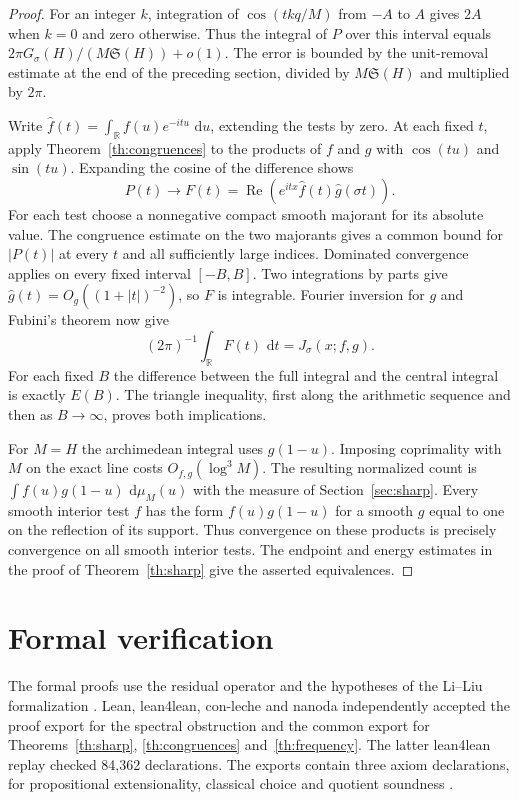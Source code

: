 \documentclass[11pt,a4paper]{article}
\newcommand{\SSg}{\mathfrak S}
\newcommand{\dd}{\,\mathrm d}
\DeclareMathOperator{\Rea}{Re}
\begin{document}
\begin{proof}
For an integer $k$, integration of $\cos(tkq/M)$ from $-A$ to $A$
gives $2A$ when $k=0$ and zero otherwise. Thus the integral of $P$
over this interval equals $2\pi G_\sigma(H)/(M\SSg(H))+o(1)$.
The error is bounded by the unit-removal estimate at the end of the
preceding section, divided by $M\SSg(H)$ and multiplied by $2\pi$.

Write $\widehat f(t)=\int_\mathbb R f(u)e^{-itu}\,\dd u$, extending
the tests by zero. At each fixed $t$, apply
Theorem~\ref{th:congruences} to the products of $f$ and $g$ with
$\cos(tu)$ and $\sin(tu)$. Expanding the cosine of the difference
shows
\[
 P(t)\longrightarrow
 F(t)=\Rea\!\left(e^{itx}\widehat f(t)\widehat g(\sigma t)\right).
\]
For each test choose a nonnegative compact smooth majorant for its
absolute value. The congruence estimate on the two majorants gives
a common bound for $|P(t)|$ at every $t$ and all sufficiently large
indices. Dominated convergence applies on every fixed interval
$[-B,B]$. Two integrations by parts give
$\widehat g(t)=O_g((1+|t|)^{-2})$, so $F$ is integrable.
Fourier inversion for $g$ and Fubini's theorem now give
\[
 (2\pi)^{-1}\int_\mathbb R F(t)\,\dd t=J_\sigma(x;f,g).
\]
For each fixed $B$ the difference between the full integral and the
central integral is exactly $E(B)$. The triangle inequality, first
along the arithmetic sequence and then as $B\to\infty$, proves both
implications.

For $M=H$ the archimedean integral uses $g(1-u)$. Imposing
coprimality with $M$ on the exact line costs $O_{f,g}(\log^3 M)$.
The resulting normalized count is
$\int f(u)g(1-u)\,\dd\mu_M(u)$ with the measure of
Section~\ref{sec:sharp}. Every smooth interior test $f$ has the form
$f(u)g(1-u)$ for a smooth $g$ equal to one on the reflection of its
support. Thus convergence on these products is precisely convergence
on all smooth interior tests. The endpoint and energy estimates in
the proof of Theorem~\ref{th:sharp} give the asserted equivalences.
\end{proof}

\section*{Formal verification}
The formal proofs use the residual operator and the hypotheses of the Li--Liu formalization \cite{LLLean}. Lean, lean4lean, con-leche and nanoda independently accepted the proof export for the spectral obstruction and the common export for Theorems~\ref{th:sharp}, \ref{th:congruences} and~\ref{th:frequency}. The latter lean4lean replay checked 84,362 declarations. The exports contain three axiom declarations, for propositional extensionality, classical choice and quotient soundness \cite{formal}.
\end{document}
